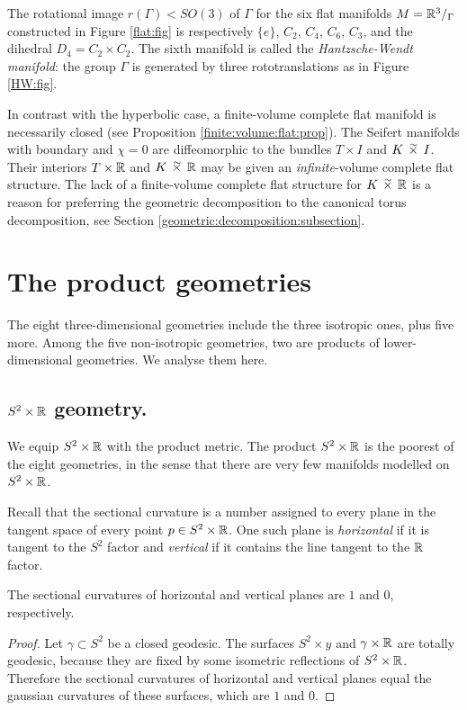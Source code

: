 \begin{rem}
The rotational image $r(\Gamma) < SO(3)$ of $\Gamma$ for the six flat manifolds $M=\mathbb{R}^3/_\Gamma$ constructed in Figure \ref{flat:fig} is respectively $\{e\}$, $C_2$, $C_4$, $C_6$, $C_3$, and the dihedral $D_4 = C_2\times C_2$. The sixth manifold is called the \emph{Hantzsche-Wendt manifold}: the group $\Gamma$ is generated by three rototranslations as in Figure \ref{HW:fig}.
\end{rem}

In contrast with the hyperbolic case, a finite-volume complete flat manifold is necessarily closed (see Proposition \ref{finite:volume:flat:prop}). The Seifert manifolds with boundary and $\chi=0$ are diffeomorphic to the bundles $T\times I$ and $K\timtil I$. Their interiors $T\times \mathbb{R}$ and $K\timtil \matR$ may be given an \emph{infinite}-volume complete flat structure. The lack of a finite-volume complete flat structure for $K\timtil \matR$ is a reason for preferring the geometric decomposition to the canonical torus decomposition, see Section \ref{geometric:decomposition:subsection}.

\section{The product geometries}
The eight three-dimensional geometries include the three isotropic ones, plus five more. Among the five non-isotropic geometries, two are products of lower-dimensional geometries. We analyse them here.

\subsection{$S^2 \times \mathbb{R}$ geometry.}
We equip $S^2\times \mathbb{R}$ with the product metric. The product $S^2\times \mathbb{R}$ is the poorest of the eight geometries, in the sense that there are very few manifolds modelled on $S^2\times \mathbb{R}$. 

Recall that the sectional curvature is a number assigned to every plane in the tangent space of every point $p\in S^2 \times \mathbb{R}$. One such plane is \emph{horizontal} if it is tangent to the $S^2$ factor and \emph{vertical} if it contains the line tangent to the $\mathbb{R}$ factor.

\begin{prop}
The sectional curvatures of horizontal and vertical planes are $1$ and $0$, respectively.
\end{prop}
\begin{proof}
Let $\gamma \subset S^2$ be a closed geodesic. The surfaces $S^2 \times y$ and $\gamma\times \mathbb{R}$ are totally geodesic, because they are fixed by some isometric reflections of $S^2\times \mathbb{R}$. Therefore the sectional curvatures of horizontal and vertical planes equal the gaussian curvatures of these surfaces, which are $1$ and $0$.
\end{proof}

